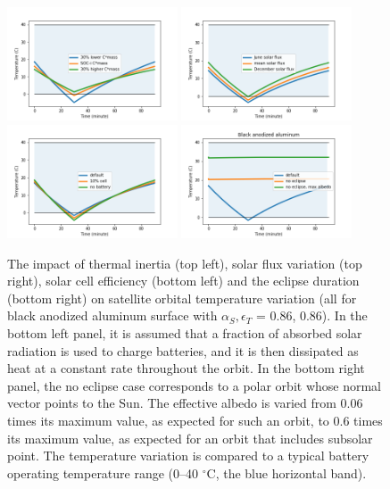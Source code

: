 \documentclass[]{aastex62}
\begin{document}
\begin{figure}[t]
\centering
\includegraphics[width=0.45\textwidth, keepaspectratio]{figures/3tempsVStime_BlackAnodizedMassVariation.png}
\includegraphics[width=0.45\textwidth, keepaspectratio]{figures/3tempsVStime_BlackAnodizedFsunVariation.png}
\includegraphics[width=0.45\textwidth, keepaspectratio]{figures/3tempsVStime_BlackAnodizedChargingVariation.png}
\includegraphics[width=0.45\textwidth, keepaspectratio]{figures/3tempsVStime_BlackAnodizedOrbitVariation.png}
\caption{The impact of thermal inertia (top left), solar flux variation (top right), solar cell efficiency (bottom left)
and the eclipse duration (bottom right) on satellite orbital temperature variation (all for black anodized aluminum 
surface with $\alpha_S, \epsilon_T$  = 0.86, 0.86). In the bottom left panel, it is assumed that a fraction of 
absorbed solar radiation is used to charge batteries, and it is then dissipated as heat at a constant rate
throughout the orbit. In the bottom right panel, the no eclipse case corresponds to a polar orbit whose normal
vector points to the Sun. The effective albedo is varied from 0.06 times its maximum value, as expected for such
an orbit, to 0.6 times its maximum value, as expected for an orbit that includes subsolar point. The temperature variation 
is compared to a typical battery operating temperature range (0--40 $^\circ$C, the blue horizontal band).  
\label{fig:Tt2}}
\end{figure}
\end{document}
